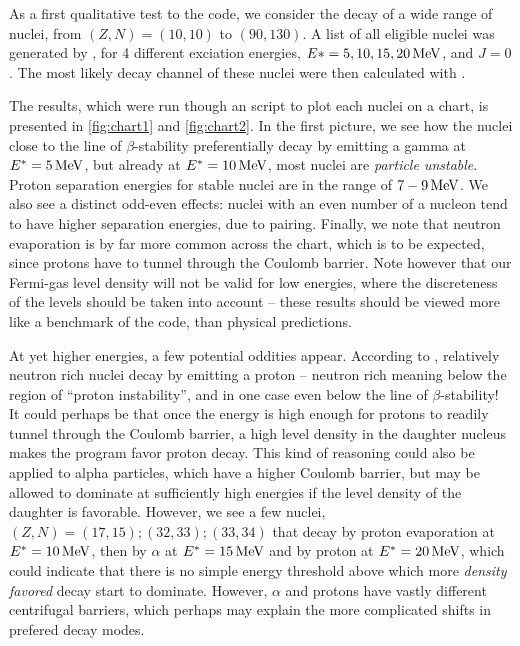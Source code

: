 As a first qualitative test to the code, we consider the decay of a wide range of nuclei, from $(Z,N)=(10,10)$ to $(90,130)$.
A list of all eligible nuclei was generated by , for 4 different exciation energies, $E*=\unit[5, 10, 15, 20]{MeV}$, and $J=0$. The most likely decay channel of these nuclei were then calculated with .

The results, which were run though an  script to plot each nuclei on a chart, is presented in \autoref{fig:chart1} and \autoref{fig:chart2}. In the first picture, we see how the nuclei close to the line of $\beta$-stability preferentially decay by emitting a gamma at $E^*=\unit[5]{MeV}$, but already at $E^*=\unit[10]{MeV}$, most nuclei are \emph{particle unstable}. Proton separation energies for stable nuclei are in the range of $\unit[7-9]{MeV}$\cite{audi:1995}.
We also see a distinct odd-even effects: nuclei with an even number of a nucleon tend to have higher separation energies, due to pairing. Finally, we note that neutron evaporation is by far more common across the chart, which is to be expected, since protons have to tunnel through the Coulomb barrier. %
Note however that our Fermi-gas level density will not be valid for low energies, where the discreteness of the levels should be taken into account -- these results should be viewed more like a benchmark of the code, than physical predictions.

At yet higher energies, a few potential oddities appear. According to \codename{}, relatively neutron rich nuclei decay by emitting a proton -- neutron rich meaning below the region of ``proton instability'', and in one case even below the line of $\beta$-stability!
It could perhaps be that once the energy is high enough for protons to readily tunnel through the Coulomb barrier, a high level density in the daughter nucleus makes the program favor proton decay. 
This kind of reasoning could also be applied to alpha particles, which have a higher Coulomb barrier, but may be allowed to dominate at sufficiently high energies if the level density of the daughter is favorable. However, we see a few nuclei, $(Z,N)=(17,15); (32,33); (33,34)$ that decay by proton evaporation at $E^*=\unit[10]{MeV}$, then by $\alpha$ at $E^*=\unit[15]{MeV}$ and by proton at $E^*=\unit[20]{MeV}$, which could indicate that there is no simple energy threshold above which more \emph{density favored} decay start to dominate. However, $\alpha$ and protons have vastly different centrifugal barriers, which perhaps may explain the more complicated shifts in prefered decay modes.

